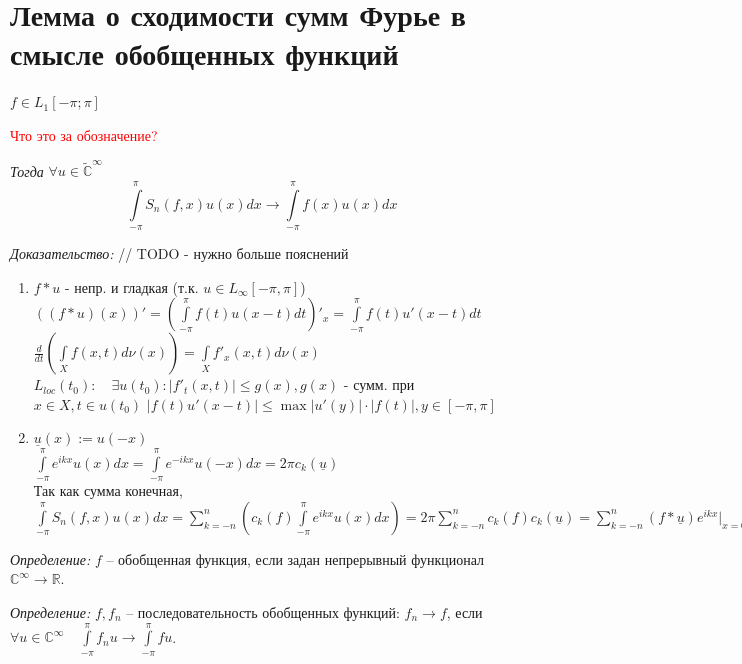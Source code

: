 \documentclass[paper=a4, fontsize=17pt]{article}
\begin{document}
\section{Лемма о сходимости сумм Фурье в смысле обобщенных функций}
$f \in L_1[-\pi;\pi]$

\textcolor{red}{Что это за обозначение?}

\emph{Тогда} $\forall u \in \widetilde{\mathbb{C}}^{\infty}$
$$\int\limits_{-\pi}^\pi S_n(f, x) u(x) dx \rightarrow \int\limits_{-\pi}^\pi f(x) u(x) dx$$

\emph{Доказательство:} // TODO - нужно больше пояснений

\begin{enumerate}
	\item $f \ast u$ - непр. и гладкая (т.к. $u \in L_{\infty}[-\pi, \pi]$) \\
	$((f \ast u)(x))'=(\int\limits_{-\pi}^\pi f(t) u(x-t) dt)'_x=\int\limits_{-\pi}^\pi f(t) u'(x-t) dt$ \\
	$\frac d {dt} (\int\limits_X f(x, t) d\nu(x))=\int\limits_X f'_x(x,t)d\nu(x)$\\
	$L_{loc}(t_0) :\quad \exists u(t_0) : \lvert f'_t(x,t)\rvert \le g(x), g(x)$ - сумм. при $x \in X, t \in u(t_0)$
	$\lvert f(t)u'(x-t) \rvert \le \max \lvert u'(y) \rvert \cdot \lvert f(t) \rvert, y \in [-\pi, \pi]$
	
	\item 
	$\underline{u}(x) := u(-x)$\\
	$\int\limits_{-\pi}^\pi e^{ikx} u(x) dx = \int\limits_{-\pi}^\pi e^{-ikx} u(-x) dx = 2\pi c_k(\underline{u})$\\
	Так как сумма конечная, $\int\limits_{-\pi}^\pi S_n(f, x) u(x) dx = \sum\limits_{k = -n}^n(c_k(f)\int\limits_{-\pi}^\pi e^{ikx} u(x) dx) = 2\pi\sum\limits_{k = -n}^{n} c_k(f) c_k(\underline{u}) = \sum\limits_{k = -n}^{n} (f \ast \underline{u}) e^{ikx} \biggr\vert_{x = 0} \rightarrow (f' \ast \underline{u})(0) = \int\limits_{-\pi}^{\pi} f(t) \underline{u} (0 - t) dt = \int\limits_{-\pi}^{\pi} f(t) u(t) dt$
\end{enumerate}

\emph{Определение:} $f$ -- обобщенная функция, если задан непрерывный функционал $\mathbb{C}^\infty \rightarrow \mathbb{R}$.

\emph{Определение:} $f, f_n$ -- последовательность обобщенных функций: $f_n \rightarrow f$, если $\forall u \in \mathbb{C}^\infty \quad \int\limits_{-\pi}^{\pi} f_n u \rightarrow \int\limits_{-\pi}^{\pi} f u$.
\end{document}
